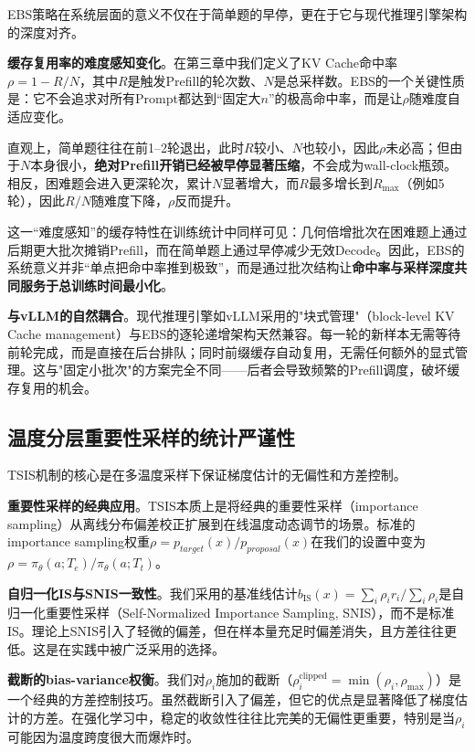 EBS策略在系统层面的意义不仅在于简单题的早停，更在于它与现代推理引擎架构的深度对齐。

\textbf{缓存复用率的难度感知变化}。在第三章中我们定义了KV Cache命中率$\rho = 1 - R/N$，其中$R$是触发Prefill的轮次数、$N$是总采样数。EBS的一个关键性质是：它不会追求对所有Prompt都达到“固定大$n$”的极高命中率，而是让$\rho$随难度自适应变化。

直观上，简单题往往在前1--2轮退出，此时$R$较小、$N$也较小，因此$\rho$未必高；但由于$N$本身很小，\textbf{绝对Prefill开销已经被早停显著压缩}，不会成为wall-clock瓶颈。相反，困难题会进入更深轮次，累计$N$显著增大，而$R$最多增长到$R_{\max}$（例如5轮），因此$R/N$随难度下降，$\rho$反而提升。

这一“难度感知”的缓存特性在训练统计中同样可见：几何倍增批次在困难题上通过后期更大批次摊销Prefill，而在简单题上通过早停减少无效Decode。因此，EBS的系统意义并非“单点把命中率推到极致”，而是通过批次结构让\textbf{命中率与采样深度共同服务于总训练时间最小化}。

\textbf{与vLLM的自然耦合}。现代推理引擎如vLLM采用的"块式管理"（block-level KV Cache management）与EBS的逐轮递增架构天然兼容。每一轮的新样本无需等待前轮完成，而是直接在后台排队；同时前缀缓存自动复用，无需任何额外的显式管理。这与"固定小批次"的方案完全不同——后者会导致频繁的Prefill调度，破坏缓存复用的机会。

\subsection{温度分层重要性采样的统计严谨性}
\label{subsec:tsis_statistical_rigor}

TSIS机制的核心是在多温度采样下保证梯度估计的无偏性和方差控制。

\textbf{重要性采样的经典应用}。TSIS本质上是将经典的重要性采样（importance sampling）从离线分布偏差校正扩展到在线温度动态调节的场景。标准的importance sampling权重$\rho = p_{target}(x) / p_{proposal}(x)$在我们的设置中变为$\rho = \pi_\theta(a; T_e) / \pi_\theta(a; T_t)$。

\textbf{自归一化IS与SNIS一致性}。我们采用的基准线估计$b_{\text{IS}}(x) = \sum_i \rho_i r_i / \sum_i \rho_i$是自归一化重要性采样（Self-Normalized Importance Sampling, SNIS），而不是标准IS。理论上SNIS引入了轻微的偏差，但在样本量充足时偏差消失，且方差往往更低。这是在实践中被广泛采用的选择。

\textbf{截断的bias-variance权衡}。我们对$\rho_i$施加的截断（$\rho_i^{\text{clipped}} = \min(\rho_i, \rho_{\max})$）是一个经典的方差控制技巧。虽然截断引入了偏差，但它的优点是显著降低了梯度估计的方差。在强化学习中，稳定的收敛性往往比完美的无偏性更重要，特别是当$\rho_i$可能因为温度跨度很大而爆炸时。

